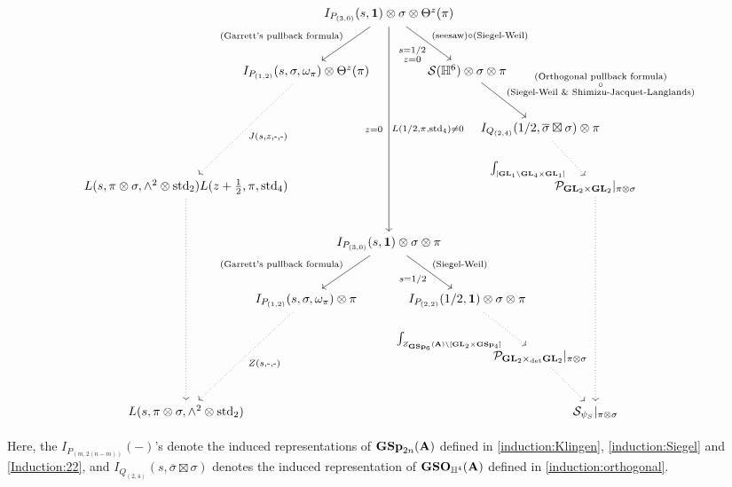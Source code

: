 \documentclass[11pt, reqno]{amsart}
\theoremstyle{plain}
\theoremstyle{definition}
\theoremstyle{remark}
\theoremstyle{plain}
\def\A{{\bf A}}
\def\GSp{{\mathbf{GSp}}}
\def\GSO{{\mathbf{GSO}}}
\def\GL{\mathbf{GL}}
\begin{document}
\begin{small}
\begin{equation*}
\begin{tikzcd}[row sep=large, column sep={-1.5em,-1em,0.5em,-1em,-1.5em}]
& & I_{P_{(3,0)}}(s,\mathbf{1})\otimes \sigma \otimes \Theta^z(\pi)\arrow[dddd, "L(1/2\text{,}\pi\text{,}\mathrm{std}_4) \ne 0","z = 0\text{ } "']  \arrow[ld, swap, "(\text{Garrett's pullback formula})"]  \arrow[dr, "\text{(seesaw)}\circ\text{(Siegel-Weil)}", "\substack{s = 1/2\\ z = 0}"']& & &
\\
& I_{P_{(1,2)}}(s,\sigma,\omega_{\pi})\otimes \Theta^z(\pi)\arrow[ddl, dotted, "J(s\text{,}z\text{,-,-})"] &&  \mathcal{S}(\mathbb{H}^6)\otimes \sigma \otimes \pi \arrow[dr, "\substack{\text{(Orthogonal pullback formula)}\\ \circ\\\text{(Siegel-Weil \& Shimizu-Jacquet-Langlands)}}"] & &
\\
&&& & I_{Q_{(2,4)}}(1/2,\overline{\sigma}\boxtimes \sigma)\otimes \pi \arrow[rd, dotted,swap, "\int_{[\mathbf{GL}_1\setminus \mathbf{GL}_4\times\mathbf{GL}_1]}"] &
\\
L(s,\pi\otimes\sigma,\wedge^2\otimes \mathrm{std}_2)L(z+\tfrac{1}{2},\pi,\mathrm{std}_4) \arrow[dddd, dotted]&&& &&\mathcal{P}_{\mathbf{GL}_2\times\mathbf{GL}_2}|_{\pi\otimes\sigma} \arrow[dddd, dotted]
\\
& & I_{P_{(3,0)}}(s,\mathbf{1})\otimes \sigma \otimes \pi
  \arrow[rd, "\text{(Siegel-Weil)}", "s = 1/2"']
  \arrow[ld, swap, "(\text{Garrett's pullback formula})"]
&  & &
\\
& I_{P_{(1,2)}}(s,\sigma,\omega_{\pi})\otimes \pi \arrow[ddl, dotted, "Z(s\text{,-,-})"]&
& I_{P_{(2,2)}}(1/2, \mathbf{1})\otimes \sigma \otimes \pi
  \arrow[dr, dotted,  swap, "\int_{Z_{\mathbf{GSp}_6}(\A)\setminus [\mathbf{GL}_2\times \mathbf{GSp}_4]}"] &  &
\\
 &&& &\mathcal{P}_{\GL_2 \times_{\rm det} \GL_2} |_{\pi \otimes \sigma}  \arrow[dr, dotted] &\\
 L(s,\pi\otimes\sigma,\wedge^2\otimes \mathrm{std}_2)
&&& & &\mathcal{S}_{\psi_S}|_{\pi \otimes \sigma} 
\end{tikzcd}
\end{equation*}
\end{small}

Here, the $I_{P_{(m,2(n-m))}}(-)$'s denote the induced representations of $\GSp_{2n}(\A)$ defined in \eqref{induction:Klingen}, \eqref{induction:Siegel} and \eqref{Induction:22}, and $I_{Q_{(2,4)}}(s,\overline{\sigma}\boxtimes \sigma)$ denotes the induced representation of $\GSO_{\mathbb{H}^4}(\A)$ defined in \eqref{induction:orthogonal}. 
\end{document}
